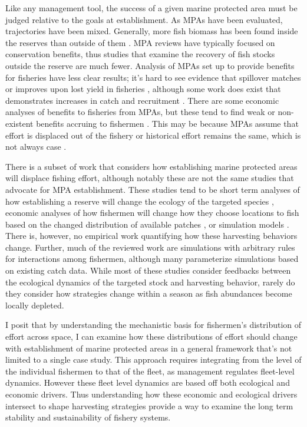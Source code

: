 \documentclass[12pt,a4paper]{report}
\begin{document}
Like any management tool, the success of a given marine protected area must be judged relative to the goals at establishment. As MPAs have been evaluated, trajectories have been mixed. Generally, more fish biomass has been found inside the reserves than outside of them \citep{PoluninRoberts:1993, RussAlcala:1996, McClanahanMangi:2000, Halpern:2003, Lesteretal:2009}.  MPA reviews have typically focused on conservation benefits, thus studies that examine the recovery of fish stocks outside the reserve are much fewer. Analysis of MPAs set up to provide benefits for fisheries have less clear results; it's hard to see evidence that spillover matches or improves upon lost yield in fisheries \citep{Hilborn:OceanCoastalManagement:2004}, although some work does exist that demonstrates increases in catch \citep{Russetal:2004, JanuchowskiHartleyetal:2012, Alemanyetal:2013} and recruitment \citep{Harrisonetal:2012}. There are some economic analyses of benefits to fisheries from MPAs, but these tend to find weak or non-existent benefits accruing to fishermen \citep{Smithetal:2006, SanchiricoWilen:2001, Hannesson:1998, HollandBrazee:1996}. This may be because MPAs assume that effort is displaced out of the fishery or historical effort remains the same, which is not always case \citep{Branchetal:2006}. 

There is a subset of work that considers how establishing marine protected areas  will displace fishing effort, although notably these are not the same studies that advocate for MPA establishment. These studies tend to be short term analyses of how establishing a reserve will change the ecology of the targeted species \citep{Dinmoreetal:2003}, economic analyses of how fishermen will change how they choose locations to fish based on the changed distribution of available patches \citep{SanchiricoWilen:2001, Wilenetal:2002, SmithWilen:2003, Sanchiricoetal:2006, ValderramaAnderson:2007, KahuiAlexander:2008}, or simulation models \citep{Littleetal:2005}. There is, however, no empirical work quantifying how these harvesting behaviors change.  Further, much of the reviewed work are simulations with arbitrary rules for interactions among fishermen, although many parameterize simulations based on existing catch data. While most of these studies consider feedbacks between the ecological dynamics of the targeted stock and harvesting behavior, rarely do they consider how strategies change within a season as fish abundances become locally depleted. 

I posit that by understanding the mechanistic basis for fishermen's distribution of effort across space, I can examine how these distributions of effort should change with establishment of marine protected areas in a general framework that's not limited to a single case study. This approach requires integrating from the level of the individual fishermen to that of the fleet, as management regulates fleet-level dynamics. However these fleet level dynamics are based off both ecological and economic drivers. Thus understanding how these economic and ecological drivers intersect to shape harvesting strategies provide a way to examine the long term stability and sustainability of fishery systems.
\end{document}
